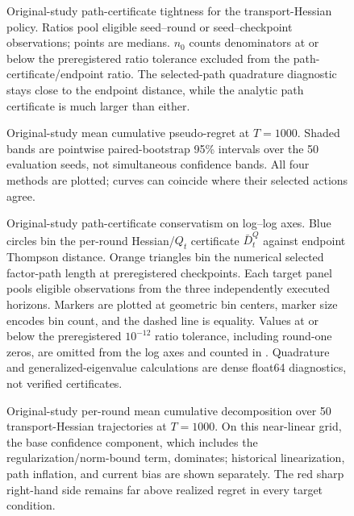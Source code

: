 \begin{figure}[p]
  \centering
  
  \caption{Original-study path-certificate tightness for the transport-Hessian
  policy. Ratios pool eligible seed--round or seed--checkpoint observations;
  points are medians. $n_0$ counts denominators at or below the preregistered
  ratio tolerance excluded from the path-certificate/endpoint ratio.
  The selected-path quadrature diagnostic stays close to the endpoint distance,
  while the analytic path certificate is much larger than either.}
  \label{fig:transport-original-path-ratios}
\end{figure}
\clearpage

\begin{figure}[p]
  \centering
  
  \caption{Original-study mean cumulative pseudo-regret at $T=1000$.  Shaded bands are
  pointwise paired-bootstrap 95\% intervals over the 50 evaluation seeds, not
  simultaneous confidence bands.  All four methods are plotted; curves can
  coincide where their selected actions agree.}
  \label{fig:transport-instantiation-regret}
\end{figure}
\clearpage

\begin{figure}[p]
  \centering
  
  \caption{Original-study path-certificate conservatism on log--log axes.  Blue circles bin
  the per-round Hessian/$Q_t$ certificate $\bar D_t^Q$ against endpoint
  Thompson distance.  Orange triangles bin the numerical selected factor-path
  length at preregistered checkpoints.  Each target panel pools eligible
  observations from the three independently executed horizons.  Markers are
  plotted at geometric bin centers, marker size encodes bin count, and the
  dashed line is equality.  Values at or below the
  preregistered $10^{-12}$ ratio tolerance, including round-one zeros, are
  omitted from the log axes and counted in
  .  Quadrature and
  generalized-eigenvalue calculations are dense float64 diagnostics, not
  verified certificates.}
  \label{fig:transport-instantiation-tightness}
\end{figure}
\clearpage

\begin{figure}[p]
  \centering
  
  \caption{Original-study per-round mean cumulative decomposition over 50 transport-Hessian
  trajectories at $T=1000$.  On this near-linear grid, the base confidence component,
  which includes the regularization/norm-bound term, dominates; historical linearization, path
  inflation, and current bias are shown separately.  The red sharp right-hand
  side remains far above realized regret in every target condition.}
  \label{fig:transport-instantiation-bound}
\end{figure}
\clearpage

